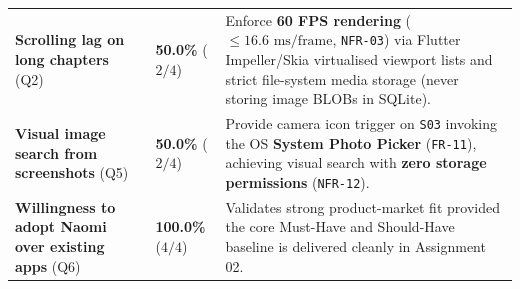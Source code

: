 \begin{table}[H]
\begin{tabularx}{\textwidth}{L{4.2cm} C{2.0cm} Y}
\textbf{Scrolling lag on long chapters} (Q2) & \textbf{50.0\%} ($2/4$) & Enforce \textbf{60 FPS rendering} ($\le 16.6\text{ ms/frame}$, \texttt{NFR-03}) via Flutter Impeller/Skia virtualised viewport lists and strict file-system media storage (never storing image BLOBs in SQLite). \\
\textbf{Visual image search from screenshots} (Q5) & \textbf{50.0\%} ($2/4$) & Provide camera icon trigger on \texttt{S03} invoking the OS \textbf{System Photo Picker} (\texttt{FR-11}), achieving visual search with \textbf{zero storage permissions} (\texttt{NFR-12}). \\
\textbf{Willingness to adopt Naomi over existing apps} (Q6) & \textbf{100.0\%} ($4/4$) & Validates strong product-market fit provided the core Must-Have and Should-Have baseline is delivered cleanly in Assignment 02. \\
\bottomrule
\end{tabularx}
\end{table}
